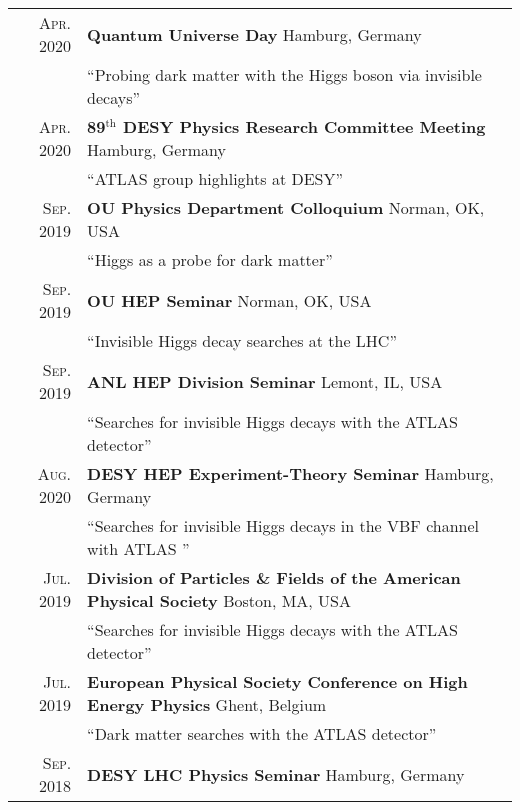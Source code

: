 \documentclass[a4paper,10pt]{article}
\begin{document}
\begin{tabular}{rp{15.5cm}}
\textsc{Apr. 2020}		& {\bf Quantum Universe Day} \hfill Hamburg, Germany\\
						& ``Probing dark matter with the Higgs boson via invisible decays''  	\\
\textsc{Apr. 2020}		& {\bf 89$^{\mathrm{th}}$ DESY Physics Research Committee Meeting} \hfill Hamburg, Germany\\
						& ``ATLAS group highlights at DESY''  	\\
\textsc{Sep. 2019}		& {\bf OU Physics Department Colloquium} \hfill Norman, OK, USA\\
						& ``Higgs as a probe for dark matter''  	\\
\textsc{Sep. 2019}		& {\bf OU HEP Seminar} \hfill Norman, OK, USA\\
						& ``Invisible Higgs decay searches at the LHC''  	\\
\textsc{Sep. 2019}		& {\bf ANL HEP Division Seminar} \hfill Lemont, IL, USA \\
						& ``Searches for invisible Higgs decays with the ATLAS detector''  	\\
\textsc{Aug. 2020}		& {\bf DESY HEP Experiment-Theory Seminar} \hfill Hamburg, Germany\\
						& ``Searches for invisible Higgs decays in the VBF channel with ATLAS ''  	\\
\textsc{Jul. 2019}		& {\bf Division of Particles \& Fields of the American Physical Society} \hfill Boston, MA, USA \\
						& ``Searches for invisible Higgs decays with the ATLAS detector''  	\\
\textsc{Jul. 2019}		& {\bf European Physical Society Conference on High Energy Physics} \hfill Ghent, Belgium \\
						& ``Dark matter searches with the ATLAS detector''  	\\
\textsc{Sep. 2018}		& {\bf DESY LHC Physics Seminar} \hfill Hamburg, Germany\\

\end{tabular}
\end{document}
